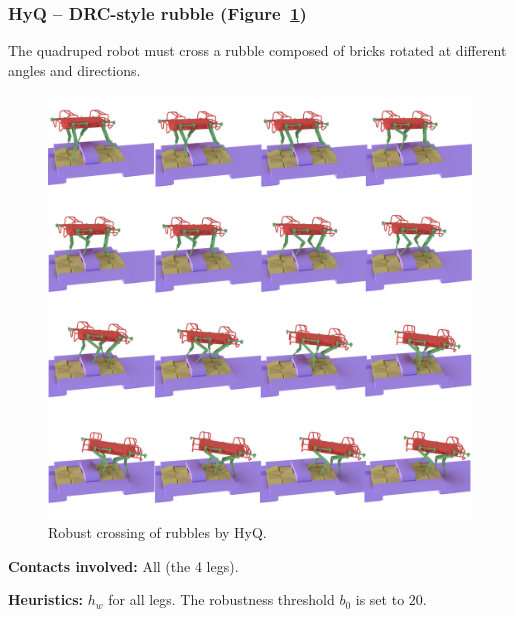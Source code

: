 \documentclass[journal]{IEEEtran}
\newcommand{\commentt}[2]{\textcolor{#1}{\textbf{\textit{[#2]}}}} 	%
\newcommand{\adnote}[1]{\commentt{blue}{AD: #1}}
\newcommand{\gls}[1]{\textit{#1}}
\providecommand{\DIFaddend}{\protect\color{black}} %
\begin{document}
\DIFaddend \subsubsection{HyQ -- DRC-style rubble (Figure~\ref{fig:darpa})}
The quadruped robot must cross a rubble composed of bricks rotated at different angles and directions.

\begin{figure}
  \centering
  \includegraphics[width=1\linewidth]{figures/darpa}
  \caption{
           Robust crossing of rubbles by HyQ. }
		   \label{fig:darpa}
\end{figure}


\noindent\textbf{Contacts involved:} All (the 4 legs).

\noindent\textbf{Heuristics:} $h_w$ for all legs. The robustness threshold $b_0$ is set to $20$.

\end{document}
